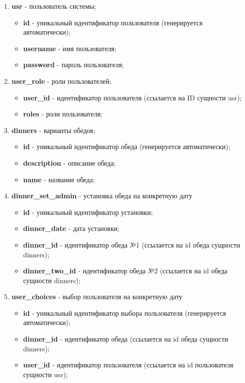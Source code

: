 \documentclass[a4paper]{article}
\begin{document}
\begin{enumerate}
\setlength{\itemsep}{-2mm}
	\item \textbf{usr} - пользователь системы;
	\begin{itemize}
	\setlength{\itemsep}{-2mm}
		\item \textbf{id} - уникальный идентификатор пользователя (генерируется автоматически);
		\item \textbf{username} - имя пользователя;
		\item \textbf{password} -  пароль пользователя;
	\end{itemize}
	\item \textbf{user\_role} - роли пользователей;
		\begin{itemize}
		\setlength{\itemsep}{-2mm}
			\item \textbf{user\_id} - идентификатор пользователя (ссылается на ID сущности usr);
			\item \textbf{roles} - роли пользователя;
		\end{itemize}
	\item \textbf{dinners} - варианты обедов;
		\begin{itemize}
			\setlength{\itemsep}{-2mm}
				\item \textbf{id} - уникальный идентификатор обеда (генерируется автоматически);
				\item \textbf{description} - описание обеда;
				\item \textbf{name} -  название обеда;
			\end{itemize}
	\item \textbf{dinner\_set\_admin} - установка обеда на конкретную дату
		\begin{itemize}
			\setlength{\itemsep}{-2mm}
				\item \textbf{id} - уникальный идентификатор установки;
				\item \textbf{dinner\_date} - дата установки;
				\item \textbf{dinner\_id} - идентификатор обеда №1 (ссылается на id обеда сущности dinners);
				\item \textbf{dinner\_two\_id} - идентификатор обеда №2 (ссылается на id обеда сущности dinners);
			\end{itemize}
	\item \textbf{user\_choices} - выбор пользователя на конкретную дату
		\begin{itemize}
					\setlength{\itemsep}{-2mm}
						\item \textbf{id} - уникальный идентификатор выбора пользователя (генерируется автоматически);
						\item \textbf{dinner\_id} - идентификатор обеда (ссылается на id обеда сущности dinners);
						\item \textbf{user\_id} -  идентификатор пользователя (ссылается на id пользователя сущности usr);
					\end{itemize}
\end{enumerate}
\end{document}
